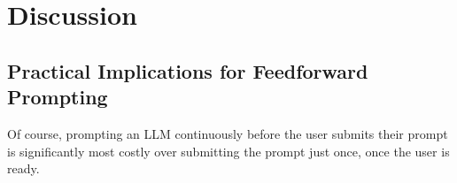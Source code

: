 \section{Discussion}
\label{section:discussion}


\subsection{Practical Implications for Feedforward Prompting}

Of course, prompting an LLM continuously before the user submits their prompt is significantly most costly over submitting the prompt just once, once the user is ready.



\subsection{}








